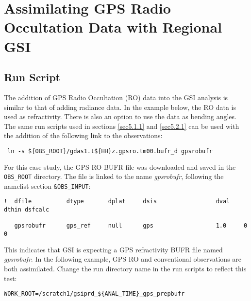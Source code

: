 \section{Assimilating GPS Radio Occultation Data with Regional GSI}

\subsection{Run Script}

The addition of GPS Radio Occultation (RO) data into the GSI analysis is similar to that of adding radiance data. In the example below, the RO data is used as refractivity.  There is also an option to use the data as bending angles. The same run scripts used in sections \ref{sec5.1.1} and \ref{sec5.2.1} can be used with the addition of the following link to the observations:

\begin{scriptsize}
\begin{verbatim}
 ln -s ${OBS_ROOT}/gdas1.t${HH}z.gpsro.tm00.bufr_d gpsrobufr
\end{verbatim}
\end{scriptsize}

For this case study, the GPS RO BUFR file was downloaded and saved in the \verb|OBS_ROOT| directory.  The file is linked to the name \textit{gpsrobufr}, following the namelist section \verb|&OBS_INPUT|:

\begin{scriptsize}
\begin{verbatim}
!  dfile          dtype       dplat     dsis                 dval    dthin dsfcalc

   gpsrobufr      gps_ref     null      gps                  1.0     0     0
\end{verbatim}
\end{scriptsize}
This indicates that GSI is expecting a GPS refractivity BUFR file named \textit{gpsrobufr}.  In the following example, GPS RO and conventional observations are both assimilated.  Change the run directory name in the run scripts to reflect this test:

\begin{scriptsize}
\begin{verbatim}
WORK_ROOT=/scratch1/gsiprd_${ANAL_TIME}_gps_prepbufr
\end{verbatim}
\end{scriptsize}

